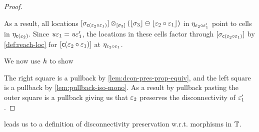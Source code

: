 \begin{proof}
\begin{center}
    \end{center}
    As a result, all locations $[\sigma_{\mathsf{c}(\varepsilon_2 \circ \varepsilon_1)}] \otimes_{[\sigma_3]} (\lfloor\sigma_3\rfloor \ominus \lfloor\varepsilon_2 \circ \varepsilon_1\rfloor)$
    in $\eta_{\varepsilon_2 \circ \varepsilon_1'}$ point to cells in $\eta_{\mathsf{c}(\varepsilon_2)}$.
    Since $\mathit{u}\varepsilon_1 = \mathit{u}\varepsilon_1'$, the locations in these cells factor through $[\sigma_{\mathsf{c}(\varepsilon_2 \circ \varepsilon_1)}]$ by \cref{def:reach-loc}
    for $[\mathsf{c}(\varepsilon_2 \circ \varepsilon_1)]$ at $\eta_{\varepsilon_2 \circ \varepsilon_1}$.

    We now use $\mathit{h}$ to show
    \begin{center}
    \end{center}
    The right square is a pullback by \cref{lem:dcon-pres-prop-equiv}, and the left square is a pullback by \cref{lem:pullback-iso-mono}. 
    As a result by pullback pasting the outer square is a pullback giving us that $\varepsilon_2$ preserves the disconnectivity of $\varepsilon_1'$.
\end{proof}

 leads us to a definition of disconnectivity preservation w.r.t. morphisms in $\mathbb{T}$.

